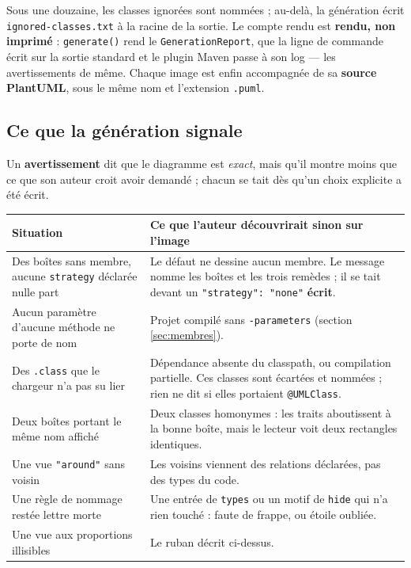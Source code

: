 \documentclass[12pt, a4paper]{article}
\begin{document}
Sous une douzaine, les classes ignorées sont nommées ; au-delà, la génération écrit \texttt{ignored-classes.txt} à la racine de la sortie. Le compte rendu est \textbf{rendu, non imprimé} : \texttt{generate()} rend le \texttt{GenerationReport}, que la ligne de commande écrit sur la sortie standard et le plugin Maven passe à son log --- les avertissements de même. Chaque image est enfin accompagnée de sa \textbf{source PlantUML}, sous le même nom et l'extension \texttt{.puml}.

\subsection{Ce que la génération signale}
\label{sec:avertissements-generation}
Un \textbf{avertissement} dit que le diagramme est \textit{exact}, mais qu'il montre moins que ce que son auteur croit avoir demandé ; chacun se tait dès qu'un choix explicite a été écrit.

\begin{longtable}{@{}L{6.3cm}L{10.3cm}@{}}
\hline
\textbf{Situation} & \textbf{Ce que l'auteur découvrirait sinon sur l'image} \\
\hline
\endhead
Des boîtes sans membre, aucune \texttt{strategy} déclarée nulle part & Le défaut ne dessine aucun membre. Le message nomme les boîtes et les trois remèdes ; il se tait devant un \texttt{"strategy": "none"} \textbf{écrit}. \\[0.4em]
Aucun paramètre d'aucune méthode ne porte de nom & Projet compilé sans \texttt{-parameters} (section \ref{sec:membres}). \\[0.4em]
Des \texttt{.class} que le chargeur n'a pas su lier & Dépendance absente du classpath, ou compilation partielle. Ces classes sont écartées et nommées ; rien ne dit si elles portaient \texttt{@UMLClass}. \\[0.4em]
Deux boîtes portant le même nom affiché & Deux classes homonymes : les traits aboutissent à la bonne boîte, mais le lecteur voit deux rectangles identiques. \\[0.4em]
Une vue \texttt{"around"} sans voisin & Les voisins viennent des relations déclarées, pas des types du code. \\[0.4em]
Une règle de nommage restée lettre morte & Une entrée de \texttt{types} ou un motif de \texttt{hide} qui n'a rien touché : faute de frappe, ou étoile oubliée. \\[0.4em]
Une vue aux proportions illisibles & Le ruban décrit ci-dessus. \\
\hline
\end{longtable}
\end{document}
